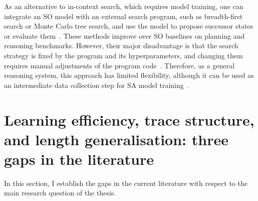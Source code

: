 As an alternative to in-context search, which requires model training, one can integrate an SO model with an external search program, such as breadth-first search or Monte Carlo tree search, and use the model to propose successor states or evaluate them~\citep{yaoTreeThoughtsDeliberate2023,haoReasoningLanguageModel2023,herrLLMFirstSearchSelfGuided2025}.
These methods improve over SO baselines on planning and reasoning benchmarks.
However, their major disadvantage is that the search strategy is fixed by the program and its hyperparameters, and changing them requires manual adjustments of the program code~\citep{herrLLMFirstSearchSelfGuided2025}.
Therefore, as a general reasoning system, this approach has limited flexibility, although it can be used as an intermediate data collection step for SA model training~\citep{kimASTROTeachingLanguage2025}.

\section{Learning efficiency, trace structure, and length generalisation: three gaps in the literature}
\label{sec:bg_gaps}

In this section, I establish the gaps in the current literature with respect to the main research question of the thesis.

